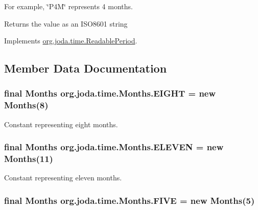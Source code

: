 For example, \char`\"{}\-P4\-M\char`\"{} represents 4 months.

\begin{DoxyReturn}{Returns}
the value as an I\-S\-O8601 string 
\end{DoxyReturn}


Implements \hyperlink{interfaceorg_1_1joda_1_1time_1_1_readable_period_a6040c2282959a2d2f6694421591ad0f2}{org.\-joda.\-time.\-Readable\-Period}.



\subsection{Member Data Documentation}
\hypertarget{classorg_1_1joda_1_1time_1_1_months_a92e43a8ee3b84c22b1b21040830daa47}{
\subsubsection[{E\-I\-G\-H\-T}]{\setlength{\rightskip}{0pt plus 5cm}final {\bf Months} org.\-joda.\-time.\-Months.\-E\-I\-G\-H\-T = new {\bf Months}(8)\hspace{0.3cm}{\ttfamily [static]}}}\label{classorg_1_1joda_1_1time_1_1_months_a92e43a8ee3b84c22b1b21040830daa47}
Constant representing eight months. \hypertarget{classorg_1_1joda_1_1time_1_1_months_aabf1e5dddc3443a101fbac742932bc24}{
\subsubsection[{E\-L\-E\-V\-E\-N}]{\setlength{\rightskip}{0pt plus 5cm}final {\bf Months} org.\-joda.\-time.\-Months.\-E\-L\-E\-V\-E\-N = new {\bf Months}(11)\hspace{0.3cm}{\ttfamily [static]}}}\label{classorg_1_1joda_1_1time_1_1_months_aabf1e5dddc3443a101fbac742932bc24}
Constant representing eleven months. \hypertarget{classorg_1_1joda_1_1time_1_1_months_a6a64e80661426078710e44d0c25141c5}{
\subsubsection[{F\-I\-V\-E}]{\setlength{\rightskip}{0pt plus 5cm}final {\bf Months} org.\-joda.\-time.\-Months.\-F\-I\-V\-E = new {\bf Months}(5)\hspace{0.3cm}{\ttfamily [static]}}}\label{classorg_1_1joda_1_1time_1_1_months_a6a64e80661426078710e44d0c25141c5}
